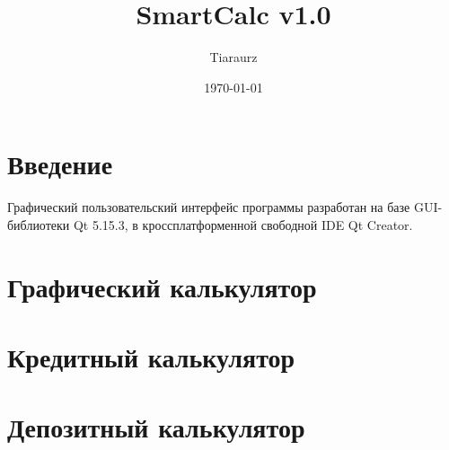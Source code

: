 \documentclass[a4paper,12pt]{article}
\author{Tiaraurz}
\title{SmartCalc v1.0}
\date{\today}
\begin{document}
	
\maketitle
\clearpage

\section{Введение}
Графический пользовательский интерфейс программы разработан на базе GUI-библиотеки Qt 5.15.3, в кроссплатформенной свободной IDE Qt Creator.
\section{Графический калькулятор}

\section{Кредитный калькулятор}
\section{Депозитный калькулятор}

	
	
\end{document}
